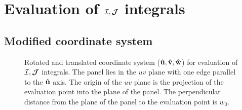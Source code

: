 \documentclass[letterpaper]{article}
\begin{document}
\newpage
\section{Evaluation of $\mathcal{I}, \boldsymbol{\mathcal{J}}$ integrals}

\subsection{Modified coordinate system}
\begin{figure}
\begin{center}
\caption{Rotated and translated coordinate system 
         ($\mathbf{\hat u},\mathbf{\hat v},\mathbf{\hat w}$) for evaluation of 
         $\mathcal{I}, \boldsymbol{\mathcal{J}}$ integrals. The panel lies in the $uv$ plane
         with one edge parallel to the $\mathbf{\hat u}$ axis. The origin
         of the $uv$ plane is the projection of the evaluation point
         into the plane of the panel. The perpendicular distance from
         the plane of the panel to the evaluation point is $w_0$.}
\label{UVWSystemFigure}
\end{center}
\end{figure}
\end{document}
